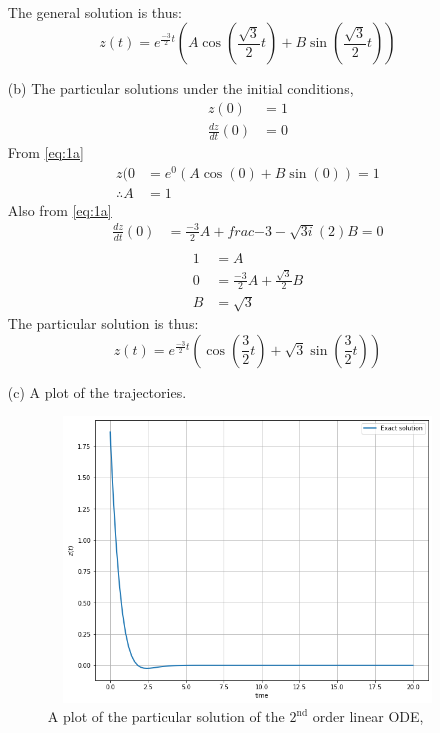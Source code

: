 \documentclass[12pt,a4paper]{article}
\begin{document}
\begin{enumerate}
\begin{align*}
						\end{align*}
					The general solution is thus:		
					\begin{equation}
								z(t) =  e^{  \frac{-3}{2}  t } \left(  A\cos \left( \frac{\sqrt{3}}{2} t \right)  + B \sin \left( \frac{\sqrt{3}}{2} t\right)   \right)
								\label{eq:1a}
					\end{equation}										
			\item[(b)]  The particular solutions under the initial conditions, 
			\begin{align*}
			     z(0) &= 1 \\
				\frac{dz} {dt} (0) &=0
			\end{align*}
			From \eqref{eq:1a}
			\begin{align*}
					z(0 &=  e^0 \left(  A\cos(0) + B\sin(0) \right) =1\\
					    \therefore A   &= 1
			\end{align*}
			Also from  \eqref{eq:1a}
			\begin{align*}
					\frac{dz}{dt}(0) &=  \frac{-3}{2} A + frac{ -3  - \sqrt{ 3i} }{ (2)} B  =  0\\
			\end{align*}
			\begin{align*}
					1  &=  A\\
					 0 &= \frac{-3}{2} A +  \frac{ \sqrt{3} }{2}B \\
					 B &= \sqrt{3}
			\end{align*}
			The particular solution is thus:
			\begin{equation}
					z(t) = e^{\frac{-3}{2} t} \left(   \cos\left(\frac{3}{2} t \right)  + \sqrt{3} \sin\left(\frac{3}{2} t \right)   \right)
					\label{eq:1part}
			\end{equation}
			\pagebreak
		\item[(c)] A plot of the trajectories.
							\begin{figure}[!h]
									\includegraphics[width=430pt,  height=215pt]{./graphics/q001_c.png}
										\caption{A plot of the particular solution of the  $2^{\text{nd}}$ order linear ODE,}
										\label{fig:q1}
								\end{figure}
\end{enumerate} 
\end{document}
